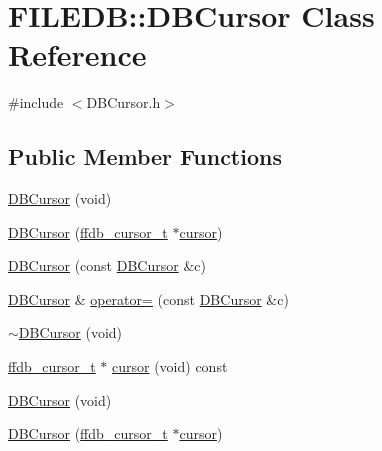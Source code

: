 \hypertarget{classFILEDB_1_1DBCursor}{}\section{F\+I\+L\+E\+DB\+:\+:D\+B\+Cursor Class Reference}
\label{classFILEDB_1_1DBCursor}


{\ttfamily \#include $<$D\+B\+Cursor.\+h$>$}

\subsection*{Public Member Functions}
\begin{DoxyCompactItemize}
\item 
\mbox{\hyperlink{classFILEDB_1_1DBCursor_aba0d95e9eb892acd1722ca46e481459d}{D\+B\+Cursor}} (void)
\item 
\mbox{\hyperlink{classFILEDB_1_1DBCursor_aaa004d2a0c3ddb6b8df9f31600c29a3b}{D\+B\+Cursor}} (\mbox{\hyperlink{other__libs_2filedb_2filehash_2ffdb__db_8h_a1383f6fb3966b0ca74206ba93b687fd9}{ffdb\+\_\+cursor\+\_\+t}} $\ast$\mbox{\hyperlink{classFILEDB_1_1DBCursor_a9e5b4a386c6f27bc1eb67714117e1e6d}{cursor}})
\item 
\mbox{\hyperlink{classFILEDB_1_1DBCursor_ae65ab90dc14febbbfa277bfd0e1533db}{D\+B\+Cursor}} (const \mbox{\hyperlink{classFILEDB_1_1DBCursor}{D\+B\+Cursor}} \&c)
\item 
\mbox{\hyperlink{classFILEDB_1_1DBCursor}{D\+B\+Cursor}} \& \mbox{\hyperlink{classFILEDB_1_1DBCursor_a2344830ead72e3005aa60545eb4fef00}{operator=}} (const \mbox{\hyperlink{classFILEDB_1_1DBCursor}{D\+B\+Cursor}} \&c)
\item 
\mbox{\hyperlink{classFILEDB_1_1DBCursor_a8c6c1bdf4c4279ab3e0d980e800c3542}{$\sim$\+D\+B\+Cursor}} (void)
\item 
\mbox{\hyperlink{other__libs_2filedb_2filehash_2ffdb__db_8h_a1383f6fb3966b0ca74206ba93b687fd9}{ffdb\+\_\+cursor\+\_\+t}} $\ast$ \mbox{\hyperlink{classFILEDB_1_1DBCursor_a9e5b4a386c6f27bc1eb67714117e1e6d}{cursor}} (void) const
\item 
\mbox{\hyperlink{classFILEDB_1_1DBCursor_aba0d95e9eb892acd1722ca46e481459d}{D\+B\+Cursor}} (void)
\item 
\mbox{\hyperlink{classFILEDB_1_1DBCursor_aaa004d2a0c3ddb6b8df9f31600c29a3b}{D\+B\+Cursor}} (\mbox{\hyperlink{other__libs_2filedb_2filehash_2ffdb__db_8h_a1383f6fb3966b0ca74206ba93b687fd9}{ffdb\+\_\+cursor\+\_\+t}} $\ast$\mbox{\hyperlink{classFILEDB_1_1DBCursor_a9e5b4a386c6f27bc1eb67714117e1e6d}{cursor}})

\end{DoxyCompactItemize}
